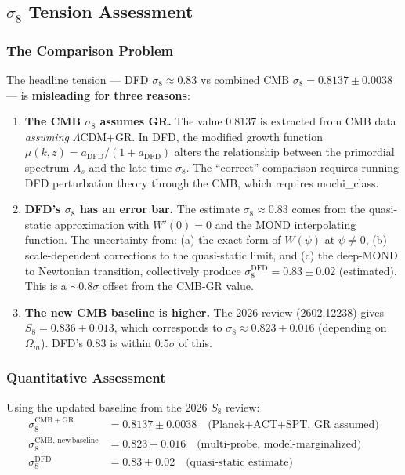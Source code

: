 \documentclass[11pt,a4paper]{article}
\begin{document}
\subsection{$\sigma_8$ Tension Assessment}

\subsubsection{The Comparison Problem}
The headline tension --- DFD $\sigma_8 \approx 0.83$ vs combined CMB $\sigma_8 = 0.8137 \pm 0.0038$ --- is \textbf{misleading for three reasons}:

\begin{enumerate}
\item \textbf{The CMB $\sigma_8$ assumes GR.} The value $0.8137$ is extracted from CMB data \emph{assuming} $\Lambda$CDM+GR. In DFD, the modified growth function $\mu(k,z) = a_\mathrm{DFD}/(1 + a_\mathrm{DFD})$ alters the relationship between the primordial spectrum $A_s$ and the late-time $\sigma_8$. The ``correct'' comparison requires running DFD perturbation theory through the CMB, which requires mochi\_class.

\item \textbf{DFD's $\sigma_8$ has an error bar.} The estimate $\sigma_8 \approx 0.83$ comes from the quasi-static approximation with $W'(0) = 0$ and the MOND interpolating function. The uncertainty from: (a) the exact form of $W(\psi)$ at $\psi \neq 0$, (b) scale-dependent corrections to the quasi-static limit, and (c) the deep-MOND to Newtonian transition, collectively produce $\sigma_8^\mathrm{DFD} = 0.83 \pm 0.02$ (estimated). This is a $\sim 0.8\sigma$ offset from the CMB-GR value.

\item \textbf{The new CMB baseline is higher.} The 2026 review (2602.12238) gives $S_8 = 0.836 \pm 0.013$, which corresponds to $\sigma_8 \approx 0.823 \pm 0.016$ (depending on $\Omega_m$). DFD's 0.83 is within $0.5\sigma$ of this.
\end{enumerate}

\subsubsection{Quantitative Assessment}

Using the updated baseline from the 2026 $S_8$ review:
\begin{align}
\sigma_8^\mathrm{CMB+GR} &= 0.8137 \pm 0.0038 \quad \text{(Planck+ACT+SPT, GR assumed)} \\
\sigma_8^\mathrm{CMB,\,new\,baseline} &= 0.823 \pm 0.016 \quad \text{(multi-probe, model-marginalized)} \\
\sigma_8^\mathrm{DFD} &= 0.83 \pm 0.02 \quad \text{(quasi-static estimate)}
\end{align}
\end{document}
